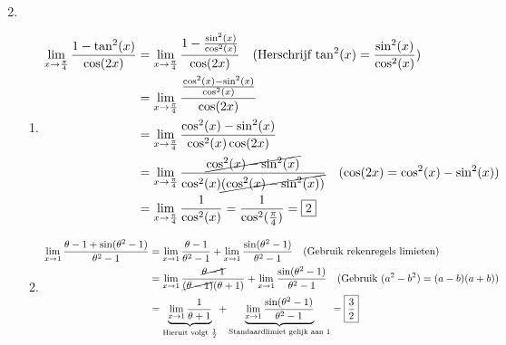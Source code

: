 \documentclass{article}
\newcommand{\f}[2]{\frac{#1}{#2}}
\begin{document}
\begin{enumerate}[label=\arabic*)]
\begin{align*}
          \end{align*}
    \item
          \begin{enumerate}[label=\alph*)]
              \item
                    \begin{align*}
                        \lim_{x \rightarrow \f{\pi}{4}}\f{1-\tan^2(x)}{\cos(2x)} & =
                        \lim_{x \rightarrow \f{\pi}{4}}\f{1-\f{\sin^2(x)}{\cos^2(x)}}{\cos(2x)}    \quad (\text{Herschrijf $\tan^2(x) = \f{\sin^2(x)}{\cos^2(x)}$})                                                                      \\
                                                                                 & =\lim_{x \rightarrow \f{\pi}{4}}\f{\f{\cos^2(x) - \sin^2(x)}{\cos^2(x)}}{\cos(2x)}                                                                    \\
                                                                                 & = \lim_{x \rightarrow \f{\pi}{4}}\f{\cos^2(x) - \sin^2(x)}{\cos^2(x)\cos(2x)}                                                                         \\
                                                                                 & = \lim_{x \rightarrow \f{\pi}{4}}\f{\cancel{\cos^2(x) - \sin^2(x)}}{\cos^2(x)\cancel{(\cos^2(x)-\sin^2(x))}} \quad (\cos(2x) = \cos^2(x) - \sin^2(x)) \\
                                                                                 & = \lim_{x \rightarrow \f{\pi}{4}}\f{1}{\cos^2(x)} = \f{1}{\cos^2(\f{\pi}{4})} = \boxed{2}
                    \end{align*}
              \item
                    \begin{align*}
                        \lim_{x \rightarrow 1} \f{\theta -1 + \sin(\theta^2 - 1)}{\theta^2-1} & = \lim_{x \rightarrow 1} \f{\theta - 1}{\theta^2 - 1} + \lim_{x \rightarrow 1}\f{\sin(\theta^2 - 1)}{\theta^2 - 1} \quad (\text{Gebruik rekenregels limieten})                                                               \\
                                                                                              & = \lim_{x \rightarrow 1} \f{\cancel{\theta - 1}}{\cancel{(\theta - 1)}(\theta + 1)} + \lim_{x \rightarrow 1}\f{\sin(\theta^2 -1 )}{\theta^2 - 1} \quad (\text{Gebruik $(a^2-b^2) = (a-b)(a+b)$})                             \\
                                                                                              & = \underbrace{\lim_{x \rightarrow 1} \f{1}{\theta + 1}}_{\text{Hieruit volgt }\f{1}{2}} + \underbrace{\lim_{x \rightarrow 1} \f{\sin(\theta^2 - 1)}{\theta^2 - 1}}_{\text{Standaardlimiet gelijk aan } 1} = \boxed{\f{3}{2}}
                    \end{align*}
          \end{enumerate}
\end{enumerate}
\end{document}
